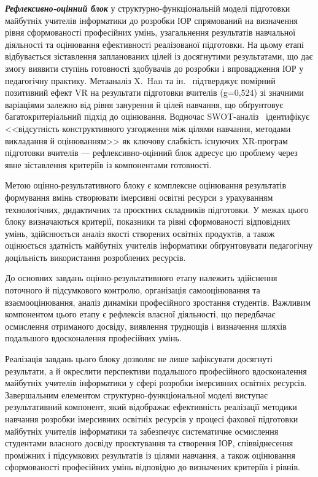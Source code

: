 \emph{\textbf{Рефлексивно-оцінний блок}} у структурно-функціональній моделі підготовки майбутніх учителів інформатики до розробки ІОР спрямований на визначення рівня сформованості професійних умінь, узагальнення результатів навчальної діяльності та оцінювання ефективності реалізованої підготовки. На цьому етапі відбувається зіставлення запланованих цілей із досягнутими результатами, що дає змогу виявити ступінь готовності здобувачів до розробки і впровадження ІОР у педагогічну практику. Метааналіз X.~Han та ін.~\cite{Han2025VRTeacherEd} підтверджує помірний позитивний ефект VR на результати підготовки вчителів (g=0,524) зі значними варіаціями залежно від рівня занурення й цілей навчання, що обґрунтовує багатокритеріальний підхід до оцінювання. Водночас SWOT-аналіз~\cite{Wang2024XRTeacherEd} ідентифікує <<відсутність конструктивного узгодження між цілями навчання, методами викладання й оцінюванням>> як ключову слабкість існуючих XR-програм підготовки вчителів --- рефлексивно-оцінний блок адресує цю проблему через явне зіставлення критеріїв із компонентами готовності.

Метою оцінно-результативного блоку є комплексне оцінювання результатів формування вмінь створювати імерсивні освітні ресурси з урахуванням технологічних, дидактичних та проєктних складників підготовки. У межах цього блоку визначаються критерії, показники та рівні сформованості відповідних умінь, здійснюється аналіз якості створених освітніх продуктів, а також оцінюється здатність майбутніх учителів інформатики обґрунтовувати педагогічну доцільність використання розроблених ресурсів.

До основних завдань оцінно-результативного етапу належить здійснення поточного й підсумкового контролю, організація самооцінювання та взаємооцінювання, аналіз динаміки професійного зростання студентів. Важливим компонентом цього етапу є рефлексія власної діяльності, що передбачає осмислення отриманого досвіду, виявлення труднощів і визначення шляхів подальшого вдосконалення професійних умінь.

Реалізація завдань цього блоку дозволяє не лише зафіксувати досягнуті результати, а й окреслити перспективи подальшого професійного вдосконалення майбутніх учителів інформатики у сфері розробки імерсивних освітніх ресурсів. Завершальним елементом структурно-функціональної моделі виступає результативний компонент, який відображає ефективність реалізації методики навчання розробки імерсивних освітніх ресурсів у процесі фахової підготовки майбутніх учителів інформатики та забезпечує систематичне осмислення студентами власного досвіду проєктування та створення ІОР, співвіднесення проміжних і підсумкових результатів із цілями навчання, а також оцінювання сформованості професійних умінь відповідно до визначених критеріїв і рівнів.

